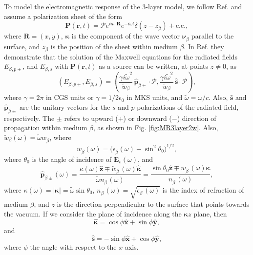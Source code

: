 To model the electromagnetic response of the 3-layer model, we follow Ref.
\cite{mizrahiJOSA88} and assume a polarization sheet of the form
\begin{equation}\label{m31}
\mathbf{P}(\mathbf{r},t) = \boldsymbol{\mathcal{P}}
  e^{i\boldsymbol{\kappa}\cdot\mathbf{R}}e^{-i\omega t}\delta(z - z_{\beta}) 
+ \mathrm{c.c.},
\end{equation}
where $\mathbf{R}=(x,y)$, $\boldsymbol{\kappa}$ is the component of the wave
vector $\boldsymbol{\nu}^{\phantom{a}}_{\beta}$ parallel to the surface, and
$z_{\beta}$ is the position of the sheet within medium $\beta$. In Ref.
\cite{sipeJOSAB87} they demonstrate that the solution of the Maxwell equations
for the radiated fields $E_{\beta,p\pm}$, and $E_{\beta,s}$ with
$\mathbf{P}(\mathbf{r},t)$ as a source can be written, at points $z\neq 0$, as
\begin{equation}\label{r2}
(E_{\beta,p\pm},E_{\beta,s}) = 
(\frac{\gamma i\tilde{\omega}^2}{\tilde{w}_{\beta}}
\,\hat{\mathbf{p}}_{\beta\pm}\cdot\boldsymbol{\mathcal{P}},
\frac{\gamma i\tilde{\omega}^2}{\tilde{w}_{\beta}}
\,\hat{\mathbf{s}}\cdot\boldsymbol{\mathcal{P}}),
\end{equation} 
where $\gamma=2\pi$ in CGS units or $\gamma=1/2\epsilon_{0}$ in MKS units, and
$\tilde{\omega}=\omega/c$. Also, $\hat{\mathbf{s}}$ and
$\hat{\mathbf{p}}_{\beta\pm}$ are the unitary vectors for the $s$ and $p$
polarizations of the radiated field, respectively. The $\pm$ refers to upward
($+$) or downward ($-$) direction of propagation within medium $\beta$, as shown
in Fig. \ref{fig:MR3layer2w}. Also,
$\tilde{w}^{\phantom{a}}_{\beta}(\omega)=\tilde{\omega}w^{\phantom{a}}_{\beta}$,
where
\begin{equation}\label{r3}
w^{\phantom{a}}_{\beta}(\omega) = 
\big(\epsilon^{\phantom{a}}_{\beta}(\omega) - \sin^{2}\theta_{0}\big)^{1/2},
\end{equation}
where $\theta_{0}$ is the angle of incidence of $\mathbf{E}_{v}(\omega)$, and
\begin{equation}\label{r4}
\hat{\mathbf{p}}^{\phantom{A}}_{\beta\pm}(\omega) =
  \frac{\kappa(\omega)\hat{\mathbf{z}}\mp 
  \tilde{w}^{\phantom{A}}_{\beta}(\omega)\hat{\boldsymbol{\kappa}}} 
  {\tilde{\omega} n^{\phantom{A}}_{\beta}(\omega)}
= \frac{\sin\theta_{0}\hat{\mathbf{z}}\mp 
  w^{\phantom{A}}_{\beta}(\omega)\hat{\boldsymbol{\kappa}}} 
  {n^{\phantom{A}}_{\beta}(\omega)},
\end{equation}
where $\kappa(\omega)=|\boldsymbol{\kappa}|=\tilde{\omega}\sin\theta_{0}$,
$n^{\phantom{A}}_{\beta}(\omega)=\sqrt{\epsilon^{\phantom{A}}_{\beta}(\omega)}$
is the index of refraction of medium $\beta$, and $z$ is the direction
perpendicular to the surface that points towards the vacuum. If we consider the
plane of incidence along the $\boldsymbol{\kappa}z$ plane, then
\begin{equation}\label{mc1}
\hat{\boldsymbol{\kappa}} = \cos\phi\hat{\mathbf{x}} + \sin\phi\hat{\mathbf{y}},
\end{equation}
and
\begin{equation}\label{mmc2}
\hat{\mathbf{s}} = -\sin\phi\hat{\mathbf{x}} + \cos\phi\hat{\mathbf{y}},
\end{equation}
where $\phi$ the angle with respect to the $x$ axis.

